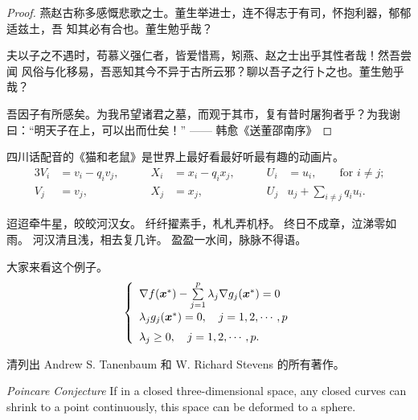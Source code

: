 \begin{proof}
	燕赵古称多感慨悲歌之士。董生举进士，连不得志于有司，怀抱利器，郁郁适兹土，吾
	知其必有合也。董生勉乎哉？
	
	夫以子之不遇时，苟慕义强仁者，皆爱惜焉，矧燕、赵之士出乎其性者哉！然吾尝闻
	风俗与化移易，吾恶知其今不异于古所云邪？聊以吾子之行卜之也。董生勉乎哉？
	
	吾因子有所感矣。为我吊望诸君之墓，而观于其市，复有昔时屠狗者乎？为我谢
	曰：“明天子在上，可以出而仕矣！” \hfill —— 韩愈《送董邵南序》
\end{proof}

\begin{corollary}
	四川话配音的《猫和老鼠》是世界上最好看最好听最有趣的动画片。
	\begin{alignat}{3}
	V_i & =v_i - q_i v_j, & \qquad X_i & = x_i - q_i x_j,
	& \qquad U_i & = u_i,
	\qquad \text{for $i\ne j$;}\label{eq:B}\\
	V_j & = v_j, & \qquad X_j & = x_j,
	& \qquad U_j & u_j + \sum_{i\ne j} q_i u_i.
	\end{alignat}
\end{corollary}

迢迢牵牛星，皎皎河汉女。
纤纤擢素手，札札弄机杼。
终日不成章，泣涕零如雨。
河汉清且浅，相去复几许。
盈盈一水间，脉脉不得语。

\begin{example}
	大家来看这个例子。
	\begin{equation}
	\label{ktc}
	\left\{\begin{array}{l}
	\nabla f({\mbox{\boldmath $x$}}^*)-\sum\limits_{j=1}^p\lambda_j\nabla g_j({\mbox{\boldmath $x$}}^*)=0\\[0.3cm]
	\lambda_jg_j({\mbox{\boldmath $x$}}^*)=0,\quad j=1,2,\cdots,p\\[0.2cm]
	\lambda_j\ge 0,\quad j=1,2,\cdots,p.
	\end{array}\right.
	\end{equation}
\end{example}

\begin{exercise}
	清列出 Andrew S. Tanenbaum 和 W. Richard Stevens 的所有著作。
\end{exercise}

\begin{conjecture} \textit{Poincare Conjecture} If in a closed three-dimensional
	space, any closed curves can shrink to a point continuously, this space can be
	deformed to a sphere.
\end{conjecture}

